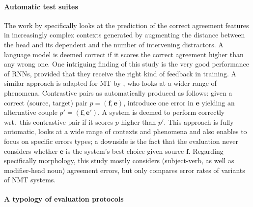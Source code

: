 \documentclass[11pt,letterpaper,final,nohyperref]{article}
\newcommand{\src}{\ensuremath{\mathbf{f}}} %
\newcommand{\trg}{\ensuremath{\mathbf{e}}} %
\begin{document}
\paragraph{Automatic test suites}
The work by \citet{Linzen16assessing} specifically looks at the prediction of the correct agreement features in increasingly complex contexts generated by augmenting the distance between the head and its dependent and the number of intervening distractors. A language model is deemed correct if it scores the correct agreement higher than any wrong one. One intriguing finding of this study is the very good performance of RNNs, provided that they receive the right kind of feedback in training. 
A similar approach is adapted for MT by \citet{Sennrich17howgrammatical}, who looks at a wider range of phenomena. Contrastive pairs as automatically produced as follows: given a correct (source, target) pair $p=(\src,\trg)$, introduce one error in $\trg $ yielding an alternative couple $p'=(\src,\trg')$. A system is deemed to perform correctly wrt.\ this contrastive pair %
if it scores $p$ higher than $p'$. This approach is fully automatic, looks at a wide range of contexts and phenomena and also enables to focus on specific errors types; a downside is the fact that the evaluation never considers whether $\trg$ is the system's best choice given source $\src$. Regarding specifically morphology, this study mostly considers (subject-verb, as well as modifier-head noun) agreement errors, but only compares error rates of variants of NMT systems.

\paragraph{A typology of evaluation protocols}
\end{document}
